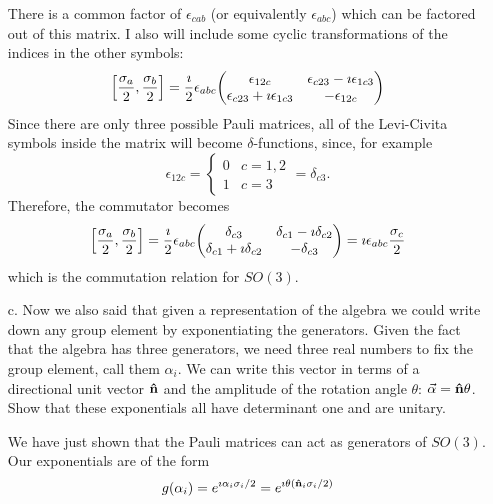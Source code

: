 \documentclass[a4paper,twoside]{article}
\begin{document}
\begin{itemize}
\begin{problem}
            There is a common factor of $ \epsilon_{cab} $ (or equivalently $ \epsilon_{abc} $) which can be factored out of this matrix. I also will include some cyclic transformations of the indices in the other symbols:
            \begin{equation}
                \comm{\frac{\sigma_a}{2}}{\frac{\sigma_b}{2}} = \frac{\imath}{2} \epsilon_{abc} \mqty(\epsilon_{12c} & \epsilon_{c23} - \imath \epsilon_{1c3} \\ \epsilon_{c23} + \imath \epsilon_{1c3} & - \epsilon_{12c}) 
            \end{equation}
            Since there are only three possible Pauli matrices, all of the Levi-Civita symbols inside the matrix will become $\delta$-functions, since, for example
            \begin{equation}
                \epsilon_{12c} = \begin{cases} 0 & c=1,2 \\ 1 & c=3 \end{cases} = \delta_{c3}.
            \end{equation}
            Therefore, the commutator becomes
            \begin{equation}
                \comm{\frac{\sigma_a}{2}}{\frac{\sigma_b}{2}} = \frac{\imath}{2} \epsilon_{abc} \mqty(\delta_{c3} & \delta_{c1} - \imath \delta_{c2} \\ \delta_{c1} + \imath \delta_{c2} & - \delta_{c3}) = \imath \epsilon_{abc} \frac{\sigma_c}{2}
            \end{equation}
            which is the commutation relation for $ SO(3) $.
        \end{problem}

    \item[c.] Now we also said that given a representation of the algebra we could write down any group element by exponentiating the generators. Given the fact that the algebra has three generators, we need three real numbers to fix the group element, call them $ \alpha_i $. We can write this vector in terms of a directional unit vector $\vu{ n} $ and the amplitude of the rotation angle $ \theta $: $ \va{\alpha} =\vu{ n} \theta $. Show that these exponentials all have determinant one and are unitary.
        \begin{problem}
            We have just shown that the Pauli matrices can act as generators of $ SO(3) $. Our exponentials are of the form
            \begin{equation}
                g(\alpha_i) = e^{\imath \alpha_i \sigma_i/2} = e^{\imath \theta (\vu{n}_i \sigma_i/2)}
            \end{equation}
            

\end{problem}
\end{itemize}
\end{document}
